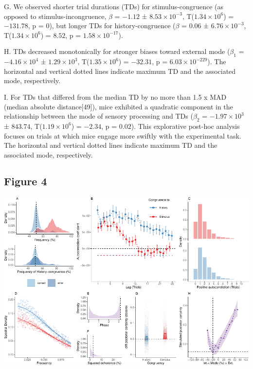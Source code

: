 \documentclass[
]{article}
\begin{document}
G. We observed shorter trial durations (TDs) for stimulus-congruence (as
opposed to stimulus-incongruence, \(\beta\) = \(-1.12\) ±
\(\ensuremath{8.53\times 10^{-3}}\),
T(\(\ensuremath{1.34\times 10^{6}}\)) = \(-131.78\), p = \(0\)), but
longer TDs for history-congruence (\(\beta\) = \(0.06\) ±
\(\ensuremath{6.76\times 10^{-3}}\),
T(\(\ensuremath{1.34\times 10^{6}}\)) = \(8.52\), p =
\(\ensuremath{1.58\times 10^{-17}}\)).

H. TDs decreased monotonically for stronger biases toward external mode
(\(\beta_1\) = \(\ensuremath{-4.16\times 10^{4}}\) ±
\(\ensuremath{1.29\times 10^{3}}\),
T(\(\ensuremath{1.35\times 10^{6}}\)) = \(-32.31\), p =
\(\ensuremath{6.03\times 10^{-229}}\)). The horizontal and vertical
dotted lines indicate maximum TD and the associated mode, respectively.

I. For TDs that differed from the median TD by no more than 1.5 x MAD
(median absolute distance{[}49{]}), mice exhibited a quadratic component
in the relationship between the mode of sensory processing and TDs
(\(\beta_2\) = \(\ensuremath{-1.97\times 10^{3}}\) ± \(843.74\),
T(\(\ensuremath{1.19\times 10^{6}}\)) = \(-2.34\), p = \(0.02\)). This
explorative post-hoc analysis focuses on trials at which mice engage
more swiftly with the experimental task. The horizontal and vertical
dotted lines indicate maximum TD and the associated mode, respectively.

\newpage

\hypertarget{figure-4}{%
\subsection{Figure 4}\label{figure-4}}

\includegraphics{modes_mouse_rev2_files/figure-latex/Figure_4-1.pdf}
\end{document}
